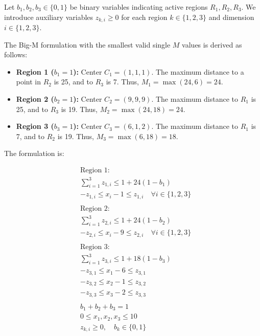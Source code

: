 \documentclass{article} %
\begin{document}
    Let $b_1, b_2, b_3 \in \{0,1\}$ be binary variables indicating active regions $R_1, R_2, R_3$. We introduce auxiliary variables $z_{k,i} \ge 0$ for each region $k \in \{1,2,3\}$ and dimension $i \in \{1,2,3\}$.

    The Big-M formulation with the smallest valid single $M$ values is derived as follows:
    \begin{itemize}
        \item \textbf{Region 1 ($b_1=1$):} Center $C_1=(1,1,1)$. The maximum distance to a point in $R_2$ is 25, and to $R_3$ is 7. Thus, $M_1 = \max(24, 6) = 24$.
        \item \textbf{Region 2 ($b_2=1$):} Center $C_2=(9,9,9)$. The maximum distance to $R_1$ is 25, and to $R_3$ is 19. Thus, $M_2 = \max(24, 18) = 24$.
        \item \textbf{Region 3 ($b_3=1$):} Center $C_3=(6,1,2)$. The maximum distance to $R_1$ is 7, and to $R_2$ is 19. Thus, $M_3 = \max(6, 18) = 18$.
    \end{itemize}

    The formulation is:

    \[
    \begin{aligned}
        & \text{Region 1:} \\
        & \sum_{i=1}^3 z_{1,i} \leq 1 + 24(1-b_1) \\
        & -z_{1,i} \leq x_i - 1 \leq z_{1,i} \quad \forall i \in \{1,2,3\} \\
        \\
        & \text{Region 2:} \\
        & \sum_{i=1}^3 z_{2,i} \leq 1 + 24(1-b_2) \\
        & -z_{2,i} \leq x_i - 9 \leq z_{2,i} \quad \forall i \in \{1,2,3\} \\
        \\
        & \text{Region 3:} \\
        & \sum_{i=1}^3 z_{3,i} \leq 1 + 18(1-b_3) \\
        & -z_{3,1} \leq x_1 - 6 \leq z_{3,1} \\
        & -z_{3,2} \leq x_2 - 1 \leq z_{3,2} \\
        & -z_{3,3} \leq x_3 - 2 \leq z_{3,3} \\
        \\
        & b_1 + b_2 + b_3 = 1 \\
        & 0 \le x_1, x_2, x_3 \le 10 \\
        & z_{k,i} \ge 0, \quad b_k \in \{0,1\}
    \end{aligned}
    \]
\end{document}
